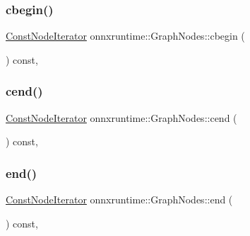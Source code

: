 \subsubsection{\texorpdfstring{cbegin()}{cbegin()}}
{\footnotesize\ttfamily \mbox{\hyperlink{classonnxruntime_1_1GraphNodes_a291880456b7298e7daededf91e494b6a}{Const\+Node\+Iterator}} onnxruntime\+::\+Graph\+Nodes\+::cbegin (\begin{DoxyParamCaption}{ }\end{DoxyParamCaption}) const\hspace{0.3cm}{\ttfamily [inline]}, {\ttfamily [noexcept]}}

\mbox{\label{classonnxruntime_1_1GraphNodes_a35efe6c770f4ecbe12d5d49aa239105e}} 
\subsubsection{\texorpdfstring{cend()}{cend()}}
{\footnotesize\ttfamily \mbox{\hyperlink{classonnxruntime_1_1GraphNodes_a291880456b7298e7daededf91e494b6a}{Const\+Node\+Iterator}} onnxruntime\+::\+Graph\+Nodes\+::cend (\begin{DoxyParamCaption}{ }\end{DoxyParamCaption}) const\hspace{0.3cm}{\ttfamily [inline]}, {\ttfamily [noexcept]}}

\mbox{\label{classonnxruntime_1_1GraphNodes_aa9426cdcde9482961f8bae49278990ad}} 
\subsubsection{\texorpdfstring{end()}{end()}\hspace{0.1cm}{\footnotesize\ttfamily [1/2]}}
{\footnotesize\ttfamily \mbox{\hyperlink{classonnxruntime_1_1GraphNodes_a291880456b7298e7daededf91e494b6a}{Const\+Node\+Iterator}} onnxruntime\+::\+Graph\+Nodes\+::end (\begin{DoxyParamCaption}{ }\end{DoxyParamCaption}) const\hspace{0.3cm}{\ttfamily [inline]}, {\ttfamily [noexcept]}}

